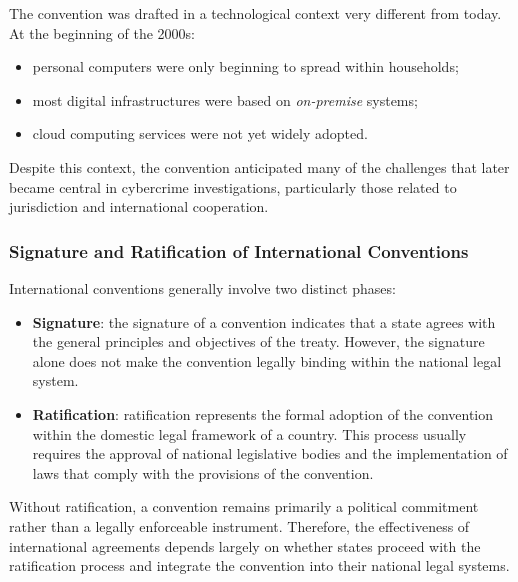 \medskip

\noindent
The convention was drafted in a technological context very different from today. At the beginning of the 2000s:

\begin{itemize}
\item personal computers were only beginning to spread within households;
\item most digital infrastructures were based on \textit{on-premise} systems;
\item cloud computing services were not yet widely adopted.
\end{itemize}

\medskip

\noindent
Despite this context, the convention anticipated many of the challenges that later became central in cybercrime investigations, particularly those related to jurisdiction and international cooperation.

\subsubsection *{Signature and Ratification of International Conventions}

International conventions generally involve two distinct phases:

\begin{itemize}

    \item \textbf{Signature}: the signature of a convention indicates that a state agrees with the general principles and objectives of the treaty. However, the signature alone does not make the convention legally binding within the national legal system.

    \item \textbf{Ratification}: ratification represents the formal adoption of the convention within the domestic legal framework of a country. This process usually requires the approval of national legislative bodies and the implementation of laws that comply with the provisions of the convention.

\end{itemize}
\noindent
Without ratification, a convention remains primarily a political commitment rather than a legally enforceable instrument. Therefore, the effectiveness of international agreements depends largely on whether states proceed with the ratification process and integrate the convention into their national legal systems.
\smallskip

